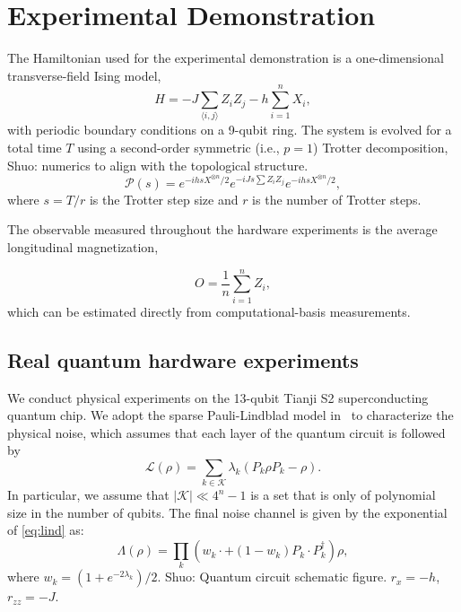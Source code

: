 \documentclass[aps,pra,reprint,groupedaddress,floatfix]{revtex4-2}
\newcommand{\sz}[1]{{\color{blue} Shuo: #1}}
\begin{document}
\section{Experimental Demonstration}

The Hamiltonian used for the experimental demonstration is a one-dimensional transverse-field Ising model,
\begin{equation*}
    H = -J \sum_{\langle i,j\rangle} Z_i Z_j - h \sum_{i=1}^{n} X_i,
\end{equation*}
with periodic boundary conditions on a 9-qubit ring. The system is evolved for a total time $T$ using a second-order symmetric (i.e., $p=1$) Trotter decomposition, \sz{numerics to align with the topological structure.}
\begin{equation*}
    \mathcal{P}(s) = e^{-i h s X^{\otimes n}/2} e^{-i J s \sum Z_i Z_j} e^{-i h s X^{\otimes n}/2},
\end{equation*}
where $s = T/r$ is the Trotter step size and $r$ is the number of Trotter steps.

The observable measured throughout the hardware experiments is the average longitudinal magnetization,

\begin{equation*}
O=\frac{1}{n} \sum_{i=1}^n Z_i,
\end{equation*}
which can be estimated directly from computational-basis measurements.

\subsection{Real quantum hardware experiments}
We conduct physical experiments on the 13-qubit Tianji S2 superconducting quantum chip. We adopt the sparse Pauli-Lindblad model in~\cite{berg_probabilistic_2023} to characterize the physical noise, which assumes that each layer of the quantum circuit is followed by
\begin{equation}\label{eq:lind}
\mathcal{L}(\rho)=\sum_{k \in \mathcal{K}} \lambda_k\left(P_k \rho P_k-\rho\right).
\end{equation}
In particular, we assume that $|\mathcal{K}| \ll 4^n-1$ is a set that is only of polynomial size in the number of qubits. The final noise channel is given by the exponential of \eqref{eq:lind} as:
\begin{equation*}
\Lambda(\rho)=\prod_k\left(w_k \cdot+\left(1-w_k\right) P_k \cdot P_k^{\dagger}\right) \rho,
\end{equation*}
where $w_k=\left(1+e^{-2 \lambda_k}\right) / 2$. \sz{Quantum circuit schematic figure. $r_x=-h$, $r_{zz}=-J$.}
\end{document}
